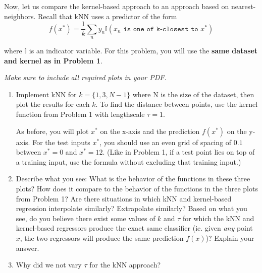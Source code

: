 \documentclass[submit]{harvardml}
\begin{document}
\begin{problem}

Now, let us compare the kernel-based approach to an approach based on
nearest-neighbors.  Recall that kNN uses a predictor of the form
  \begin{equation*}
    f(x^*) = \frac{1}{k} \sum_n y_n \mathbb{I}(x_n \texttt{ is one of k-closest to } x^*)
  \end{equation*}

\noindent where $\mathbb{I}$ is an indicator variable. For this problem, you will use the \textbf{same dataset and kernel as in Problem 1}.


\vspace{0.5cm}
\noindent\emph{Make sure to include all required plots in your PDF.}


\begin{enumerate}

\item Implement kNN for $k=\{1, 3, N-1\}$ where N is the size of the dataset, then plot the results for each $k$. To find the distance between points, use the kernel function from Problem 1 with lengthscale $\tau=1$. 

As before, you will plot $x^*$ on the x-axis and the prediction $f(x^*)$ on the y-axis.  For the test inputs $x^*$, you should use an even grid of spacing of $0.1$ between $x^* = 0$ and $x^* = 12$.  (Like in Problem 1, if a test point lies on top of a training input, use the formula without excluding that training input.)
  
  
\item Describe what you see: What is the behavior of the functions in
  these three plots?  How does it compare to the behavior of the
  functions in the three plots from Problem 1?  Are there situations
  in which kNN and kernel-based regression interpolate similarly?
  Extrapolate similarly?  Based on what you see, do you believe there
  exist some values of $k$ and $\tau$ for which the kNN and kernel-based regressors produce the exact same classifier (ie. given \textit{any} point $x$, the two regressors will produce the same prediction $f(x)$)? Explain your answer.
  
\item Why did we not vary $\tau$ for the kNN approach?

\end{enumerate}

\end{problem}
\end{document}
